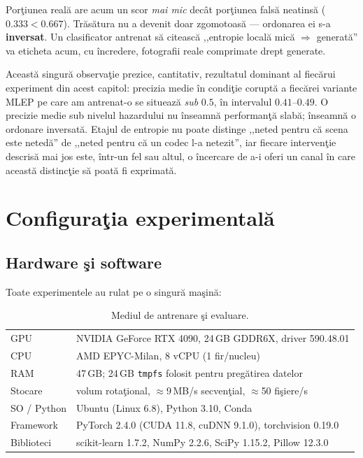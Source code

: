 Porţiunea reală are acum un scor \emph{mai mic} decât porţiunea falsă neatinsă
($0.333 < 0.667$). Trăsătura nu a devenit doar zgomotoasă --- ordonarea ei
s-a \textbf{inversat}. Un clasificator antrenat să citească ,,entropie locală
mică $\Rightarrow$ generată'' va eticheta acum, cu încredere, fotografii reale
comprimate drept generate.

Această singură observaţie prezice, cantitativ, rezultatul dominant al fiecărui
experiment din acest capitol: precizia medie în condiţie coruptă a fiecărei
variante MLEP pe care am antrenat-o se situează \emph{sub} $0.5$, în intervalul
$0.41$--$0.49$. O precizie medie sub nivelul hazardului nu înseamnă performanţă
slabă; înseamnă o ordonare inversată. Etajul de entropie nu poate distinge
,,neted pentru că scena este netedă'' de ,,neted pentru că un codec l-a
netezit'', iar fiecare intervenţie descrisă mai jos este, într-un fel sau altul,
o încercare de a-i oferi un canal în care această distincţie să poată fi
exprimată.

\section{Configuraţia experimentală}
\label{sec:setup}

\subsection{Hardware şi software}

Toate experimentele au rulat pe o singură maşină:

\begin{table}[h]
  \centering
  \caption{Mediul de antrenare şi evaluare.}
  \label{tab:hardware}
  \begin{tabular}{ll}
    \toprule
    GPU              & NVIDIA GeForce RTX 4090, 24\,GB GDDR6X, driver 590.48.01 \\
    CPU              & AMD EPYC-Milan, 8 vCPU (1 fir/nucleu) \\
    RAM              & 47\,GB; 24\,GB \texttt{tmpfs} folosit pentru pregătirea datelor \\
    Stocare          & volum rotaţional, $\approx$9\,MB/s secvenţial, $\approx$50 fişiere/s \\
    SO / Python      & Ubuntu (Linux 6.8), Python 3.10, Conda \\
    Framework        & PyTorch 2.4.0 (CUDA 11.8, cuDNN 9.1.0), torchvision 0.19.0 \\
    Biblioteci       & scikit-learn 1.7.2, NumPy 2.2.6, SciPy 1.15.2, Pillow 12.3.0 \\
    \bottomrule
  \end{tabular}
\end{table}

